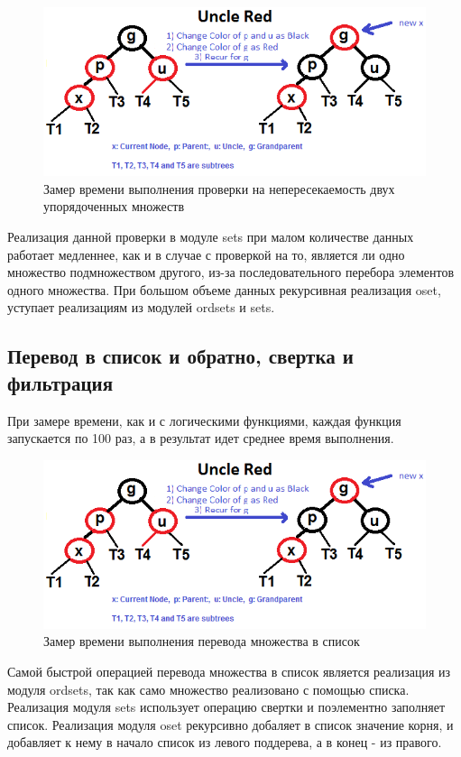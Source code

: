 		\begin{figure}[H]
				\centering
				\includegraphics[width=\textwidth]{img/tan-aus.png}
				\caption{Замер времени выполнения проверки на непересекаемость двух упорядоченных множеств}
		\end{figure}
		Реализация данной проверки в модуле sets при малом количестве данных работает медленнее, как и в случае 
		с проверкой на то, является ли одно множество подмножеством другого, из-за последовательного перебора 
		элементов одного множества. При большом объеме данных рекурсивная реализация oset, уступает реализациям из 
		модулей ordsets и sets.
				
	
	\subsection{Перевод в список и обратно, свертка и фильтрация}
		При замере времени, как и с логическими функциями, каждая функция запускается по 100 раз, а в результат идет 
		среднее время выполнения.
		
		\begin{figure}[H]
				\centering
				\includegraphics[width=\textwidth]{img/tan-aus.png}
				\caption{Замер времени выполнения перевода множества в список}
		\end{figure}
		Самой быстрой операцией перевода множества в список является реализация из модуля ordsets, так как 
		само множество реализовано с помощью списка. Реализация модуля sets использует операцию свертки и 
		поэлементно заполняет список. Реализация модуля oset рекурсивно добаляет в список значение корня,
		и добавляет к нему в начало список из левого поддерева, а в конец - из правого.
		
